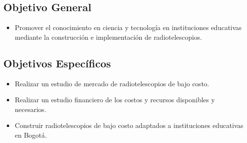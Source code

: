 \subsection{Objetivo General}
\begin{itemize}
  \item Promover el conocimiento en ciencia y tecnología en instituciones
    educativas mediante la construcción e implementación de radiotelescopios.
\end{itemize}

\subsection{Objetivos Específicos}
\begin{itemize}
  \item Realizar un estudio de mercado de radiotelescopios de bajo costo.
  \item Realizar un estudio financiero de los costos y recursos disponibles y
    necesarios.
  \item Construir radiotelescopios de bajo costo adaptados a instituciones
    educativas en Bogotá.
\end{itemize}
